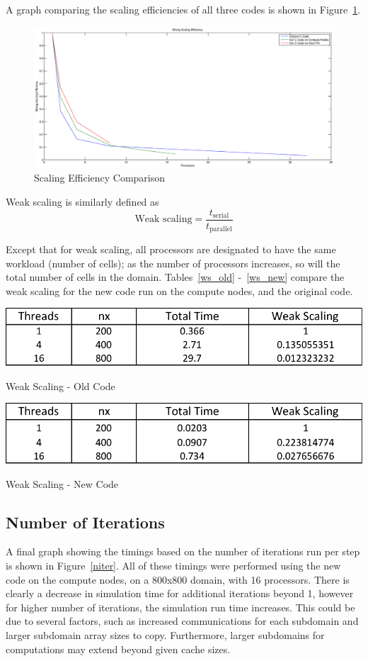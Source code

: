 \documentclass{article}
\begin{document}
A graph comparing the scaling efficiencies of all three codes is shown in Figure~\ref{fig:seff}. \\
\begin{figure}[here]
 \centering
 \includegraphics[width=0.9\linewidth]{scaleff.eps}
 \caption{Scaling Efficiency Comparison}
 \label{fig:seff}
\end{figure}
\clearpage
Weak scaling is similarly defined as \\
\begin{equation}
\textrm{Weak scaling} = \frac{t_{\textrm{serial}}}{t_{\textrm{parallel}}}
\end{equation}

Except that for weak scaling, all processors are designated to have the same workload (number of cells); as the number of processors increases, so will the total number of cells in the domain. Tables~\ref{ws_old} -~\ref{ws_new} compare the weak scaling for the new code run on the compute nodes, and the original code. \\

\begin{table}[here]
 \centering
 \includegraphics[width=0.4\linewidth]{ws_old.png}
 \caption{Weak Scaling - Old Code}
 \label{ws_old}
\end{table}
\begin{table}[here]
 \centering
 \includegraphics[width=0.4\linewidth]{ws_new.png}
 \caption{Weak Scaling - New Code}
 \label{ws_new}
\end{table}
\clearpage

\subsection{Number of Iterations}
A final graph showing the timings based on the number of iterations run per step is shown in Figure~\ref{niter}. All of these timings were performed using the new code on the compute nodes, on a 800x800 domain, with 16 processors. There is clearly a decrease in simulation time for additional iterations beyond 1, however for higher number of iterations, the simulation run time increases. This could be due to several factors, such as increased communications for each subdomain and larger subdomain array sizes to copy. Furthermore, larger subdomains for computations may extend beyond given cache sizes. 
\end{document}
